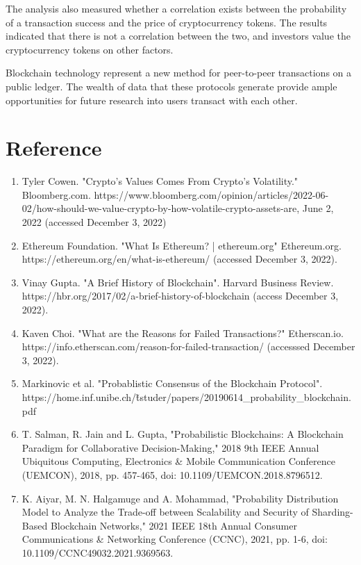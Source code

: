 \documentclass[12pt]{article}
\begin{document}
The analysis also measured whether a correlation exists between the probability of a transaction success and the price of cryptocurrency tokens. The results indicated that there is not a correlation between the two, and investors value the cryptocurrency tokens on other factors.

Blockchain technology represent a new method for peer-to-peer transactions on a public ledger. The wealth of data that these protocols generate provide ample opportunities for future research into users transact with each other.


\pagebreak
\section{Reference}
\begin{enumerate}
	\item Tyler Cowen. "Crypto's Values Comes From Crypto's Volatility." Bloomberg.com. https://www.bloomberg.com/opinion/articles/2022-06-02/how-should-we-value-crypto-by-how-volatile-crypto-assets-are, June 2, 2022 (accessed December 3, 2022)
	\item Ethereum Foundation. "What Is Ethereum? | ethereum.org" Ethereum.org. \\https://ethereum.org/en/what-is-ethereum/ (accessed December 3, 2022).
	\item Vinay Gupta. "A Brief History of Blockchain". Harvard Business Review. \\ https://hbr.org/2017/02/a-brief-history-of-blockchain (access December 3, 2022).
	\item Kaven Choi. "What are the Reasons for Failed Transactions?" Etherscan.io.\\ https://info.etherscan.com/reason-for-failed-transaction/ (accesssed December 3, 2022).
	\item Markinovic et al. "Probablistic Consensus of the Blockchain Protocol". \\ https://home.inf.unibe.ch/\~tstuder/papers/20190614\_probability\_blockchain.pdf 
	\item T. Salman, R. Jain and L. Gupta, "Probabilistic Blockchains: A Blockchain Paradigm for Collaborative Decision-Making," 2018 9th IEEE Annual Ubiquitous Computing, Electronics \& Mobile Communication Conference (UEMCON), 2018, pp. 457-465, doi: 10.1109/UEMCON.2018.8796512.
	\item K. Aiyar, M. N. Halgamuge and A. Mohammad, "Probability Distribution Model to Analyze the Trade-off between Scalability and Security of Sharding-Based Blockchain Networks," 2021 IEEE 18th Annual Consumer Communications \& Networking Conference (CCNC), 2021, pp. 1-6, doi: 10.1109/CCNC49032.2021.9369563.

\end{enumerate}
\end{document}
